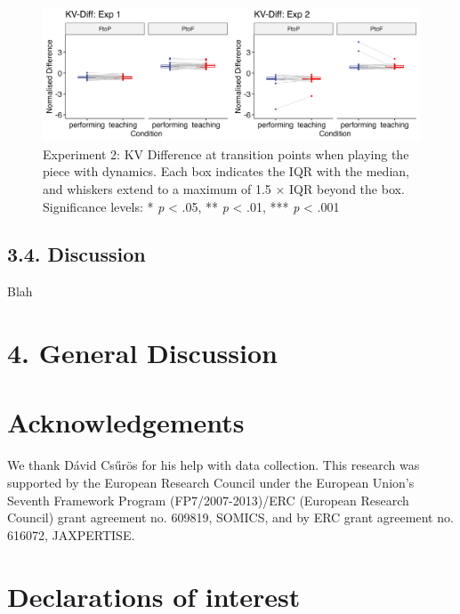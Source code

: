 \documentclass[
  english,
  man,floatsintext]{apa6}
\begin{document}
\begin{figure}
\includegraphics[width=1\linewidth]{manuscript_files/figure-latex/plot-vel-diff-2-1} \caption{\label{fig:vel-diff-2}Experiment 2: KV Difference at transition points when playing the piece with dynamics. Each box indicates the IQR with the median, and whiskers extend to a maximum of 1.5 × IQR beyond the box. Significance levels: * \textit{p} < .05, ** \textit{p} < .01, *** \textit{p} < .001}\label{fig:plot-vel-diff-2}
\end{figure}

\hypertarget{discussion-1}{%
\subsection{3.4. Discussion}\label{discussion-1}}

Blah

\newpage

\hypertarget{general-discussion}{%
\section{4. General Discussion}\label{general-discussion}}

\hypertarget{acknowledgements}{%
\section{Acknowledgements}\label{acknowledgements}}

We thank Dávid Csűrös for his help with data collection. This research was supported by the European Research Council under the European Union's Seventh Framework Program (FP7/2007-2013)/ERC (European Research Council) grant agreement no. 609819, SOMICS, and by ERC grant agreement no. 616072, JAXPERTISE.

\hypertarget{declarations-of-interest}{%
\section{Declarations of interest}\label{declarations-of-interest}}
\end{document}
